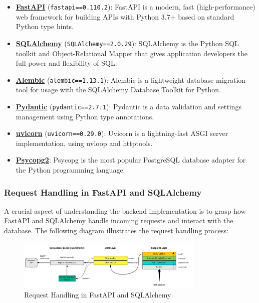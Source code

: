 \begin{itemize}
    \item \textbf{\href{https://fastapi.tiangolo.com/}{FastAPI}} (\texttt{fastapi==0.110.2}): FastAPI is a modern, fast (high-performance) web framework for building APIs with Python 3.7+ based on standard Python type hints.

    \item \textbf{\href{https://www.sqlalchemy.org/}{SQLAlchemy}} (\texttt{SQLAlchemy==2.0.29}): SQLAlchemy is the Python SQL toolkit and Object-Relational Mapper that gives application developers the full power and flexibility of SQL.

    \item \textbf{\href{https://alembic.sqlalchemy.org/en/latest/}{Alembic}} (\texttt{alembic==1.13.1}): Alembic is a lightweight database migration tool for usage with the SQLAlchemy Database Toolkit for Python.

    \item \textbf{\href{https://docs.pydantic.dev/latest/}{Pydantic}} (\texttt{pydantic==2.7.1}): Pydantic is a data validation and settings management using Python type annotations.

    \item \textbf{\href{https://www.uvicorn.org/}{uvicorn}} (\texttt{uvicorn==0.29.0}): Uvicorn is a lightning-fast ASGI server implementation, using uvloop and httptools.

    \item \textbf{\href{https://pypi.org/project/psycopg2/}{Psycopg2}}: Psycopg is the most popular PostgreSQL database adapter for the Python programming language.
\end{itemize}

\subsubsection{Request Handling in FastAPI and SQLAlchemy}

A crucial aspect of understanding the backend implementation is to grasp how FastAPI and SQLAlchemy handle incoming requests and interact with the database. The following diagram illustrates the request handling process:

\begin{figure}[h]
    \centering
    \includegraphics[width=0.8\textwidth]{images/request_handling_diagram}
    \caption{Request Handling in FastAPI and SQLAlchemy \cite{samiullah_fastapi_tutorial}}
    \label{fig:request_handling}
\end{figure}


